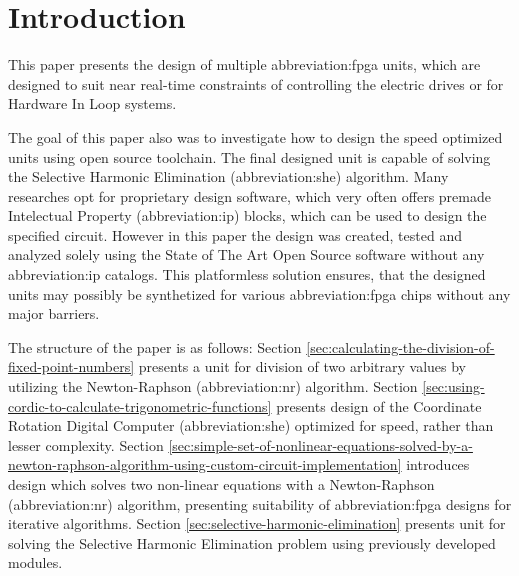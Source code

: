 \documentclass[a4paper, twoside, 11pt]{article}
\begin{document}


\tableofcontents
\newpage%
\flushbottom %
\newpage
\vspace{0pt}
\listoffigures %
\flushbottom %
\newpage
\listoftables
\flushbottom
\newpage


\null\newpage
\setcounter{page}{1}

\section{Introduction}
This paper presents the design of multiple \gls{abbreviation:fpga} units, which are designed to suit near real-time constraints of controlling the electric drives or for Hardware In Loop systems.\par
The goal of this paper also was to investigate how to design the speed optimized units using open source toolchain. The final designed unit is capable of solving the Selective Harmonic Elimination (\gls{abbreviation:she}) algorithm. Many researches opt for proprietary design software, which very often offers premade Intelectual Property (\gls{abbreviation:ip}) blocks, which can be used to design the specified circuit. However in this paper the design was created, tested and analyzed solely using the State of The Art Open Source software without any \gls{abbreviation:ip} catalogs. This platformless solution ensures, that the designed units may possibly be synthetized for various \gls{abbreviation:fpga} chips without any major barriers.\par
The structure of the paper is as follows: Section \ref{sec:calculating-the-division-of-fixed-point-numbers} presents a unit for division of two arbitrary values by utilizing the Newton-Raphson (\gls{abbreviation:nr}) algorithm. Section \ref{sec:using-cordic-to-calculate-trigonometric-functions} presents design of the Coordinate Rotation Digital Computer (\gls{abbreviation:she}) optimized for speed, rather than lesser complexity. Section \ref{sec:simple-set-of-nonlinear-equations-solved-by-a-newton-raphson-algorithm-using-custom-circuit-implementation} introduces design which solves two non-linear equations with a Newton-Raphson (\gls{abbreviation:nr}) algorithm, presenting suitability of \gls{abbreviation:fpga} designs for iterative algorithms. Section \ref{sec:selective-harmonic-elimination} presents unit for solving the Selective Harmonic Elimination problem using previously developed modules.
\end{document}
